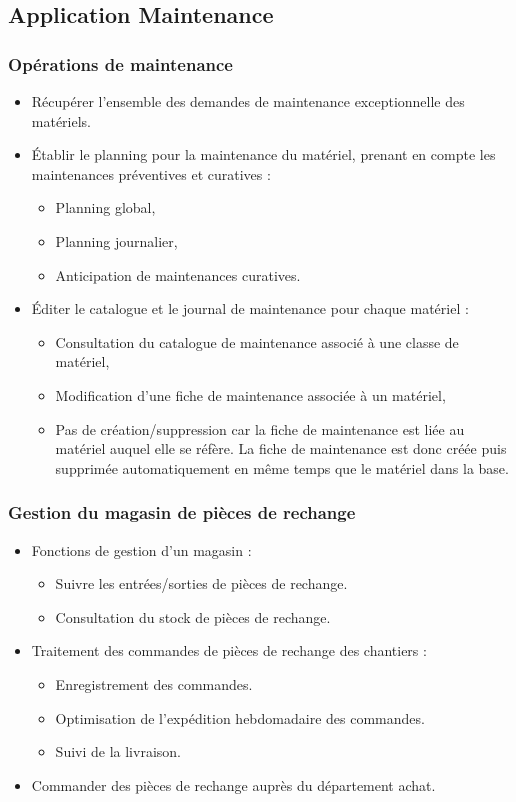 \subsection{Application Maintenance}
\subsubsection{Opérations de maintenance}
\begin{itemize}
\item Récupérer l'ensemble des demandes de maintenance exceptionnelle
des matériels.
\item Établir le planning pour la maintenance du matériel, prenant en
compte les maintenances préventives et curatives :
    \begin{itemize}
    \item Planning global,
    \item Planning journalier,
    \item Anticipation de maintenances curatives.
    \end{itemize}
\item Éditer le catalogue et le  journal de maintenance pour chaque matériel :
    \begin{itemize}
    \item Consultation du catalogue de maintenance associé à une classe de 
    matériel,
    \item Modification d'une fiche de maintenance associée à un matériel,
    \item Pas de création/suppression car la fiche de maintenance est liée
    au matériel auquel elle se réfère. La fiche de maintenance est donc
    créée puis supprimée automatiquement en même temps que le matériel dans
    la base.
    \end{itemize}
\end{itemize}

\subsubsection{Gestion du magasin de pièces de rechange}
\begin{itemize}
\item Fonctions de gestion d'un magasin :
    \begin{itemize}
    \item Suivre les entrées/sorties de pièces de rechange.
    \item Consultation du stock de pièces de rechange.
    \end{itemize}
\item Traitement des commandes de pièces de rechange des chantiers :
    \begin{itemize}
    \item Enregistrement des commandes.
    \item Optimisation de l'expédition hebdomadaire des commandes.
    \item Suivi de la livraison.
    \end{itemize}
\item Commander des pièces de rechange auprès du département achat.
\end{itemize}

